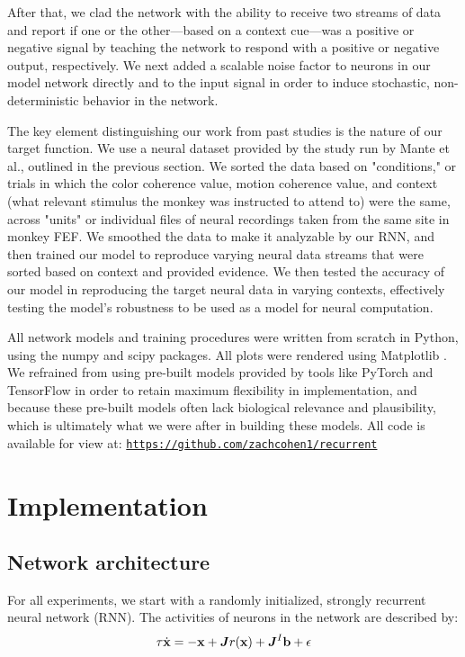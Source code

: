 \documentclass[12pt,a4paper,final]{iopart}
\begin{document}
After that, we clad the network with the ability to receive two streams of data and report if one or the other—based on a context cue—was a positive or negative signal by teaching the network to respond with a positive or negative output, respectively. We next added a scalable noise factor to neurons in our model network directly and to the input signal in order to induce stochastic, non-deterministic behavior in the network.

The key element distinguishing our work from past studies is the nature of our target function. We use a neural dataset provided by the study run by Mante et al., outlined in the previous section. We sorted the data based on "conditions," or trials in which the color coherence value, motion coherence value, and context (what relevant stimulus the monkey was instructed to attend to) were the same, across "units" or individual files of neural recordings taken from the same site in monkey FEF. We smoothed the data to make it analyzable by our RNN, and then trained our model to reproduce varying neural data streams that were sorted based on context and provided evidence. We then tested the accuracy of our model in reproducing the target neural data in varying contexts, effectively testing the model's robustness to be used as a model for neural computation.

All network models and training procedures were written from scratch in Python, using the numpy and scipy packages. All plots were rendered using Matplotlib \cite{Hunter:2007}. We refrained from using pre-built models provided by tools like PyTorch and TensorFlow in order to retain maximum flexibility in implementation, and because these pre-built models often lack biological relevance and plausibility, which is ultimately what we were after in building these models. All code is available for view at: \hyperref[https://github.com/zachcohen1/recurrent]{\texttt{https://github.com/zachcohen1/recurrent}}

\section{Implementation}
\label{sec:imp}
\subsection{Network architecture}
For all experiments, we start with a randomly initialized, strongly recurrent neural network (RNN). The activities of neurons in the network are described by:
\begin{equation}
    \tau \dot{{\bf x}} = -{\bf x} + \boldsymbol{J}r({\bf x}) + \boldsymbol{J}^I{\bf b} + {\bf \epsilon}
\end{equation}
\end{document}
